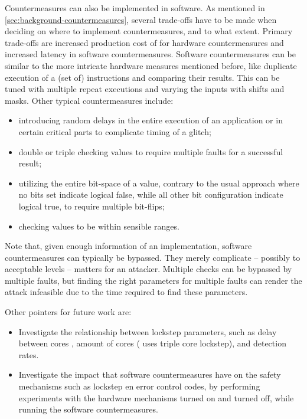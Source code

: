 \documentclass[10pt]{article}
\begin{document}
  Countermeasures can also be implemented in software. As mentioned in \autoref{sec:background-countermeasures}, several trade-offs have to be made when deciding on where to implement countermeasures, and to what extent. Primary trade-offs are increased production cost of for hardware countermeasures and increased latency in software countermeasures.
  Software countermeasures can be similar to the more intricate hardware measures mentioned before, like duplicate execution of a (set of) instructions and comparing their results. This can be tuned with multiple repeat executions and varying the inputs with shifts and masks. Other typical countermeasures include:
  \begin{itemize}
    \item introducing random delays in the entire execution of an application or in certain critical parts to complicate timing of a glitch; 
    \item double or triple checking values to require multiple faults for a successful result;
    \item utilizing the entire bit-space of a value, contrary to the usual approach where no bits set indicate logical false, while all other bit configuration indicate logical true, to require multiple bit-flips; 
    \item checking values to be within sensible ranges.
  \end{itemize}
  \noindent Note that, given enough information of an implementation, software countermeasures can typically be bypassed. They merely complicate -- possibly to acceptable levels -- matters for an attacker. Multiple checks can be bypassed by multiple faults, but finding the right parameters for multiple faults can render the attack infeasible due to the time required to find these parameters.

  Other pointers for future work are:

  \begin{itemize}
    \item Investigate the relationship between lockstep parameters, such as delay between cores \cite{tummeltshammer_analysis_2009}, amount of cores (\cite{ag_products} uses triple core lockstep), and detection rates. 
    \item Investigate the impact that software countermeasures have on the safety mechanisms such as lockstep en error control codes, by performing experiments with the hardware mechanisms turned on and turned off, while running the software countermeasures. 
  \end{itemize}
\end{document}
